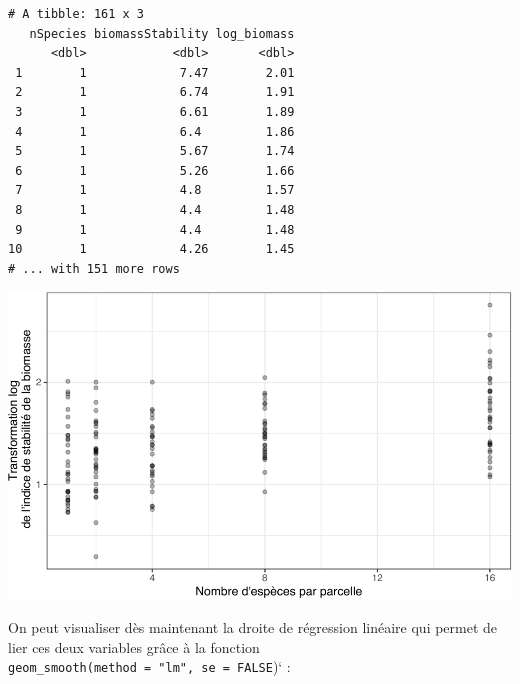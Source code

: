 \documentclass[
  a4paper,
]{article}
\newenvironment{Shaded}{\begin{snugshade}}{\end{snugshade}}
\newcommand{\CharTok}[1]{\textcolor[rgb]{0.57,0.30,0.62}{#1}}
\newcommand{\DataTypeTok}[1]{\textcolor[rgb]{0.00,0.34,0.68}{#1}}
\newcommand{\FloatTok}[1]{\textcolor[rgb]{0.69,0.50,0.00}{#1}}
\newcommand{\KeywordTok}[1]{\textcolor[rgb]{0.12,0.11,0.11}{\textbf{#1}}}
\newcommand{\NormalTok}[1]{\textcolor[rgb]{0.12,0.11,0.11}{#1}}
\newcommand{\OperatorTok}[1]{\textcolor[rgb]{0.12,0.11,0.11}{#1}}
\newcommand{\StringTok}[1]{\textcolor[rgb]{0.75,0.01,0.01}{#1}}
\begin{document}
\begin{verbatim}
# A tibble: 161 x 3
   nSpecies biomassStability log_biomass
      <dbl>            <dbl>       <dbl>
 1        1             7.47        2.01
 2        1             6.74        1.91
 3        1             6.61        1.89
 4        1             6.4         1.86
 5        1             5.67        1.74
 6        1             5.26        1.66
 7        1             4.8         1.57
 8        1             4.4         1.48
 9        1             4.4         1.48
10        1             4.26        1.45
# ... with 151 more rows
\end{verbatim}

\begin{Shaded}
\end{Shaded}

\begin{center}\includegraphics[width=0.9\linewidth]{figure/unnamed-chunk-117-1} \end{center}

On peut visualiser dès maintenant la droite de régression linéaire qui permet de lier ces deux variables grâce à la fonction \texttt{geom\_smooth(method\ =\ "lm",\ se\ =\ FALSE})` :
\end{document}
